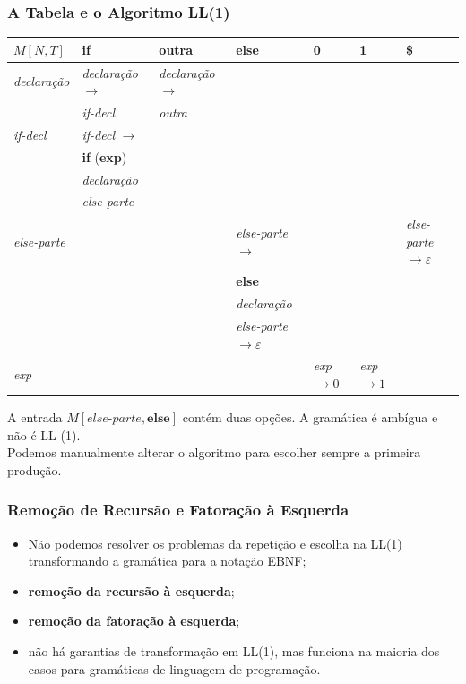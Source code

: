 \documentclass[table]{beamer}
\begin{document}
\begin{frame}
   \frametitle{A Tabela e o Algoritmo LL(1)}
   \tiny
   \begin{table}
      \begin{tabular}{l|l|l|l|l|l|l}
      \hline
      $M[N,T]$ & \textbf{if} & outra & \textbf{else} & 0 & 1 & \$ \\
      \hline 
      \textit{declaração} & \textit{declaração} $\to$ & \textit{declaração} $\to$ & & & & \\  
       & \textit{if-decl} & \textit{outra} & & & & \\  
      \hline
      \textit{if-decl} & \textit{if-decl} $\to$ & & & & & \\  
      & \textbf{if} (\textbf{exp}) & & & & & \\  
      & \textit{declaração} & & & & & \\  
      & \textit{else-parte} & & & & & \\  
      \hline
      \textit{else-parte} & & &\textit{else-parte} $\to$ & & & \textit{else-parte} $\to \varepsilon$ \\  
      & & &\textbf{else} & & & \\  
      & & &\textit{declaração} & & & \\  
      & & &\textit{else-parte} $\to \varepsilon$ & & & \\  
      \hline
      \textit{exp} & & & &\textit{exp} $\to 0$ & \textit{exp} $\to 1$ & \\  
      \end{tabular}
   \end{table}
   \normalsize
   A entrada $M[\textit{else-parte},\textbf{else}]$ contém duas opções. A gramática é ambígua e não é LL (1). \\
   Podemos manualmente alterar o algoritmo para escolher sempre a primeira produção.
\end{frame}

\begin{frame}
   \frametitle{Remoção de Recursão e Fatoração à Esquerda}
   \begin{itemize}
      \item Não podemos resolver os problemas da repetição e escolha na LL(1) transformando a gramática para a notação EBNF;
      \item \textbf{remoção da recursão à esquerda};
      \item \textbf{remoção da fatoração à esquerda};
      \item não há garantias de transformação em LL(1), mas funciona na maioria dos casos para gramáticas de linguagem de programação.
   \end{itemize}
\end{frame}
\end{document}
